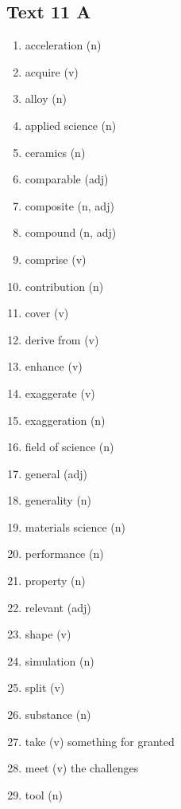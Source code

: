 \subsection*{Text 11 A}
\begin{enumerate}
      \item acceleration (n)
      \item acquire (v)
      \item alloy (n)
      \item applied science (n)
      \item ceramics (n)
      \item comparable (adj)
      \item composite (n, adj)
      \item compound (n, adj)
      \item comprise (v)
      \item contribution (n)
      \item cover (v)
      \item derive from (v)
      \item enhance (v)
      \item exaggerate (v)
      \item exaggeration (n)
      \item field of science (n)
      \item general (adj)
      \item generality (n)
      \item materials science (n)
      \item performance (n)
      \item property (n)
      \item relevant (adj)
      \item shape (v)
      \item simulation (n)
      \item split (v)
      \item substance (n)
      \item take (v) something for granted
      \item meet (v) the challenges
      \item tool (n)
\end{enumerate}

